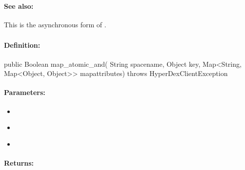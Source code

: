 \paragraph{See also:}  This is the asynchronous form of .

\pagebreak
\subsubsection{}
\label{api:java:map_atomic_and}


\paragraph{Definition:}
\begin{javacode}
public Boolean map_atomic_and(
        String spacename,
        Object key,
        Map<String, Map<Object, Object>> mapattributes) throws HyperDexClientException
\end{javacode}

\paragraph{Parameters:}
\begin{itemize}[noitemsep]
\item {}\\

\item {}\\

\item {}\\

\end{itemize}

\paragraph{Returns:}


\pagebreak
\subsubsection{}
\label{api:java:async_map_atomic_and}


